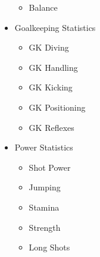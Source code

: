 \begin{multicols}{3}
\begin{itemize}
\begin{itemize}
\item	Balance
\end{itemize}
\item	Goalkeeping Statistics
\begin{itemize}
\item	GK Diving
\item	GK Handling
\item	GK Kicking
\item	GK Positioning
\item	GK Reflexes
\end{itemize}
\item	Power Statistics
\begin{itemize}
\item	Shot Power
\item	Jumping
\item	Stamina
\item	Strength
\item	Long Shots
\end{itemize}
\end{itemize}
\end{multicols}

